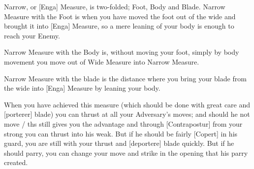 Narrow, or [Enga] Measure, is
two-folded; Foot, Body and Blade. Narrow Measure with the Foot is when
you have moved the foot out of the wide and brought it into [Enga]
Measure, so a mere leaning of your body is enough to reach your Enemy.

Narrow Measure with the Body is, without moving your foot, simply by
body movement you move out of Wide Measure into Narrow Measure.

Narrow Measure with the blade is the distance where you bring your
blade from the wide into [Enga] Measure by leaning your body.


When you have achieved this measure  (which should be done with great
care and [porterer] blade) you can thrust at all your Adversary's
moves; and should he not move / ths still gives you the advantage  and
through [Contrapostur] from your strong you can thrust into his
weak. But if he should be fairly [Copert] in his guard, you are still
with your thrust and [deportere] blade quickly. But if he should
parry, you can change your move and strike in the opening that his
parry created.


